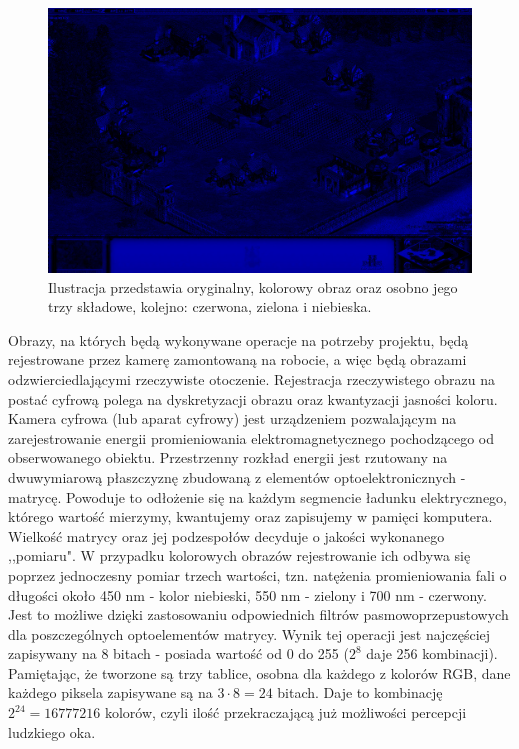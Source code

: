 \begin{figure}[H]
\begin{center}
\includegraphics[scale=0.2]{imgs/blue.jpg}
\caption[Rozbicie obrazu kolorowego na RGB.]{\small{Ilustracja przedstawia oryginalny, kolorowy obraz oraz osobno jego trzy składowe, kolejno: czerwona, zielona i niebieska.}\footnotemark}
\label{rgb}
\end{center}
\end{figure}

Obrazy, na których będą wykonywane operacje na potrzeby projektu, będą rejestrowane przez kamerę zamontowaną na robocie, a więc będą obrazami odzwierciedlającymi rzeczywiste otoczenie. Rejestracja rzeczywistego obrazu na postać cyfrową polega na dyskretyzacji obrazu oraz kwantyzacji jasności koloru\cite{Malina}. Kamera cyfrowa (lub aparat cyfrowy) jest urządzeniem pozwalającym na zarejestrowanie energii promieniowania elektromagnetycznego pochodzącego od obserwowanego obiektu. Przestrzenny rozkład energii jest rzutowany na dwuwymiarową płaszczyznę zbudowaną z elementów optoelektronicznych - matrycę. Powoduje to odłożenie się na każdym segmencie ładunku elektrycznego, którego wartość mierzymy, kwantujemy oraz zapisujemy w pamięci komputera. Wielkość matrycy oraz jej podzespołów decyduje o jakości wykonanego ,,pomiaru". W przypadku kolorowych obrazów rejestrowanie ich odbywa się poprzez jednoczesny pomiar trzech wartości, tzn. natężenia promieniowania fali o długości około 450 nm - kolor niebieski, 550 nm - zielony i 700 nm - czerwony. Jest to możliwe dzięki zastosowaniu odpowiednich filtrów pasmowoprzepustowych dla poszczególnych optoelementów matrycy.
Wynik tej operacji jest najczęściej zapisywany na 8 bitach - posiada wartość od 0 do 255 ($2^8$ daje 256 kombinacji). Pamiętając, że tworzone są trzy tablice, osobna dla każdego z kolorów RGB, dane każdego piksela zapisywane są na $3 \cdot 8 = 24$ bitach. Daje to kombinację $2^{24} = 16777216$ kolorów, czyli ilość przekraczającą już możliwości percepcji ludzkiego oka.\newpage

